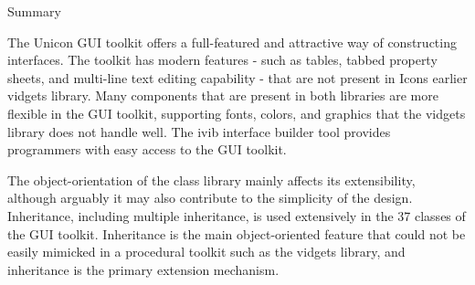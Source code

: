 {\sffamily
Summary}

The Unicon GUI toolkit offers a full-featured and attractive way of
constructing interfaces. The toolkit has modern features - such as
tables, tabbed property sheets, and multi-line text editing capability
- that are not present in Icon{\textquotesingle}s earlier vidgets
library. Many components that are present in both libraries are more
flexible in the GUI toolkit, supporting fonts, colors, and graphics
that the vidgets library does not handle well. The ivib interface
builder tool provides programmers with easy access to the GUI toolkit.

The object-orientation of the class library mainly affects its
extensibility, although arguably it may also contribute to the
simplicity of the design. Inheritance, including multiple inheritance,
is used extensively in the 37 classes of the GUI toolkit. Inheritance
is the main object-oriented feature that could not be easily mimicked
in a procedural toolkit such as the vidgets library, and inheritance is
the primary extension mechanism.


\bigskip

